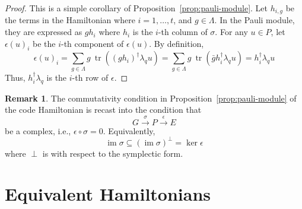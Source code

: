 \documentclass[letterpaper,12pt]{amsart}
\theoremstyle{definition} \newtheorem{defn}{Definition}
\theoremstyle{definition} \newtheorem{rem}{Remark}
\theoremstyle{definition} \newtheorem{example}{Example}
\newcommand{\tr}{\mathop{\mathrm{tr}}}
\newcommand{\im}{\mathop{\mathrm{im}}}
\begin{document}
\begin{proof}
This is a simple corollary of Proposition~\ref{prop:pauli-module}.
Let $h_{i,g}$ be the terms in the Hamiltonian where $i = 1,\ldots, t$, and $ g \in \Lambda $.
In the Pauli module, they are expressed as $g h_i$ where $h_i$ is the $i$-th column of $\sigma$.
For any $u \in P$, let $\epsilon(u)_i$ be the $i$-th component of $\epsilon(u)$. By definition,
\[
 \epsilon( u )_i 
= \sum_{g \in \Lambda} g~ \tr \left( (g h_i)^\dagger \lambda_q u \right)
= \sum_{g \in \Lambda} g~ \tr \left( \bar g h_i^\dagger \lambda_q u  \right)
= h_i^\dagger \lambda_q u
\]
Thus, $h_i^\dagger \lambda_q$ is the $i$-th row of $\epsilon$.
\end{proof}

\begin{rem}
The commutativity condition in Proposition~\ref{prop:pauli-module} of the code Hamiltonian
is recast into the condition that
\[
 G \xrightarrow{\sigma} P \xrightarrow{\epsilon} E
\]
be a complex, i.e., $\epsilon \circ \sigma = 0$.
Equivalently,
\[
 \im \sigma \subseteq (\im \sigma)^\perp = \ker \epsilon
\]
where $\perp$ is with respect to the symplectic form.
\end{rem}





\section{Equivalent Hamiltonians}
\end{document}
